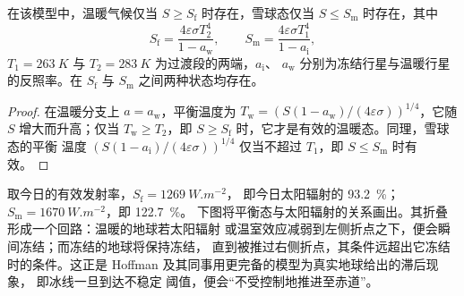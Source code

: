 \begin{proposition}[临界点]\label{prop:b2:precambrian-earth:tipping}
在该模型中，温暖气候仅当 $S \ge S_{\text{f}}$ 时存在，雪球态仅当
$S \le S_{\text{m}}$ 时存在，其中
\[
  S_{\text{f}} = \frac{4\varepsilon\sigma T_2^4}{1 - a_{\text{w}}}, \qquad
  S_{\text{m}} = \frac{4\varepsilon\sigma T_1^4}{1 - a_{\text{i}}},
\]
$T_1 = \qty{263}{K}$ 与 $T_2 = \qty{283}{K}$ 为过渡段的两端，$a_{\text{i}}$、
$a_{\text{w}}$ 分别为冻结行星与温暖行星的反照率。在 $S_{\text{f}}$ 与
$S_{\text{m}}$ 之间两种状态均存在。
\end{proposition}

\begin{proof}
在温暖分支上 $a = a_{\text{w}}$，平衡温度为 $T_{\text{w}} = (S(1 -
a_{\text{w}})/(4\varepsilon\sigma))^{1/4}$，它随 $S$ 增大而升高；仅当
$T_{\text{w}} \ge T_2$，即 $S \ge S_{\text{f}}$ 时，它才是有效的温暖态。同理，雪球态的平衡
温度 $(S(1 - a_{\text{i}})/(4\varepsilon\sigma))^{1/4}$ 仅当不超过 $T_1$，即
$S \le S_{\text{m}}$ 时有效。
\end{proof}

取今日的有效发射率，$S_{\text{f}} = \qty{1269}{W.m^{-2}}$，
即今日太阳辐射的 \qty{93.2}{\percent}；$S_{\text{m}} = \qty{1670}{W.m^{-2}}$，即 \qty{122.7}{\percent}。
下图将平衡态与太阳辐射的关系画出。其折叠形成一个回路：温暖的地球若太阳辐射
或温室效应减弱到左侧折点之下，便会瞬间冻结；而冻结的地球将保持冻结，
直到被推过右侧折点，其条件远超出它冻结时的条件。这正是
Hoffman 及其同事用更完备的模型为真实地球给出的滞后现象，
即冰线一旦到达不稳定
阈值，便会“不受控制地推进至赤道”。

